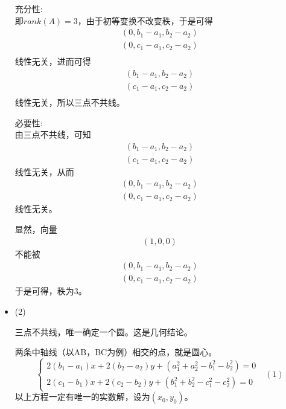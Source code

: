 \documentclass{article}
\begin{document}
\begin{itemize}
        充分性: \\
        即$rank(A) = 3$，由于初等变换不改变秩，于是可得
        \begin{align*}
          (0, b_1 - a_1, b_2 - a_2) \\
          (0, c_1 - a_1, c_2 - a_2) \\
        \end{align*}
        线性无关，进而可得
        \begin{align*}
          (b_1 - a_1, b_2 - a_2) \\
          (c_1 - a_1, c_2 - a_2) \\
        \end{align*}
        线性无关，所以三点不共线。

        必要性: \\
        由三点不共线，可知
        \begin{align*}
          (b_1 - a_1, b_2 - a_2) \\
          (c_1 - a_1, c_2 - a_2)
        \end{align*}
        线性无关，从而
        \begin{align*}
          (0, b_1 - a_1, b_2 - a_2) \\
          (0, c_1 - a_1, c_2 - a_2)
        \end{align*}
        线性无关。

        显然，向量
        \begin{align*}
          (1, 0, 0)
        \end{align*}
        不能被
        \begin{align*}
          (0, b_1 - a_1, b_2 - a_2) \\
          (0, c_1 - a_1, c_2 - a_2)
        \end{align*}
        于是可得，秩为$3$。

  \item (2)

        三点不共线，唯一确定一个圆。这是几何结论。

        两条中轴线（以AB，BC为例）相交的点，就是圆心。
        \begin{equation*}
          \begin{cases*}
            2(b_1 - a_1)x + 2(b_2 - a_2)y + (a_1^2 + a_2^2 - b_1^2 - b_2^2) = 0 \\
            2(c_1 - b_1)x + 2(c_2 - b_2)y + (b_1^2 + b_2^2 - c_1^2 - c_2^2) = 0
          \end{cases*}
          \ \ \ (1)
        \end{equation*}
        以上方程一定有唯一的实数解，设为$(x_0, y_0)$。


\end{itemize}
\end{document}
